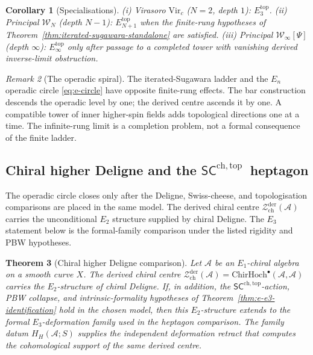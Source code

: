 \documentclass[11pt,reqno]{amsart}
\newtheorem{theorem}{Theorem}[section]
\newtheorem{corollary}[theorem]{Corollary}
\theoremstyle{definition}
\theoremstyle{remark}
\newtheorem{remark}[theorem]{Remark}
\providecommand{\cA}{\mathcal{A}}
\providecommand{\cW}{\mathcal{W}}
\providecommand{\cZ}{\mathcal{Z}}
\providecommand{\Eone}{E_1}
\providecommand{\Etwo}{E_2}
\providecommand{\Ethree}{E_3}
\providecommand{\En}{E_n}
\providecommand{\Einf}{E_\infty}
\providecommand{\SCchtop}{\ensuremath{\mathsf{SC}^{\mathrm{ch,top}}}}
\begin{document}
\begin{corollary}[Specialisations]
\label{cor:iterated-sugawara-specialisations-sa}
\textup{(i)} Virasoro $\mathrm{Vir}_c$ \textup{(}$N=2$,
depth $1$\textup{)}: $\Ethree^{\mathrm{top}}$.
\textup{(ii)} Principal $\cW_N$ \textup{(}depth $N-1$\textup{)}:
$E_{N+1}^{\mathrm{top}}$ when the finite-rung hypotheses of
Theorem~\ref{thm:iterated-sugawara-standalone} are satisfied.
\textup{(iii)} Principal $\cW_\infty[\Psi]$ \textup{(}depth
$\infty$\textup{)}: $\Einf^{\mathrm{top}}$ only after passage to a
completed tower with vanishing derived inverse-limit obstruction.
\end{corollary}

\begin{remark}[The operadic spiral]
\label{rem:operadic-spiral-sa}
The iterated-Sugawara ladder and the $\En$ operadic circle
\eqref{eq:e-circle} have opposite finite-rung effects. The bar
construction descends the operadic level by one; the derived centre
ascends it by one. A compatible tower of inner higher-spin fields adds
topological directions one at a time. The infinite-rung limit is a
completion problem, not a formal consequence of the finite ladder.
\end{remark}

\subsection[Chiral higher Deligne and the SC ch,top heptagon]{Chiral higher Deligne and the \SCchtop\ heptagon}
\label{subsec:chiral-higher-deligne}

The operadic circle closes only after the Deligne, Swiss-cheese, and
topologisation comparisons are placed in the same model. The derived
chiral centre \(\cZ^{\mathrm{der}}_{\mathrm{ch}}(\cA)\) carries the
unconditional \(\Etwo\) structure supplied by chiral Deligne. The
\(\Ethree\) statement below is the formal-family comparison under the
listed rigidity and PBW hypotheses.

\begin{theorem}[Chiral higher Deligne comparison]
\label{thm:chiral-higher-Deligne-sa}
Let $\cA$ be an $\Eone$-chiral algebra on a smooth curve $X$.
The derived chiral centre
\(\cZ^{\mathrm{der}}_{\mathrm{ch}}(\cA)
= \mathrm{ChirHoch}^\bullet(\cA,\cA)\) carries the \(\Etwo\)-structure
of chiral Deligne. If, in addition, the \(\SCchtop\)-action, PBW
collapse, and intrinsic-formality hypotheses of
Theorem~\ref{thm:e-e3-identification} hold in the chosen model, then
this \(\Etwo\)-structure extends to the formal \(\Ethree\)-deformation
family used in the heptagon comparison.  The family datum
$H_H(\cA;S)$ supplies the independent deformation retract that
computes the cohomological support of the same derived centre.
\end{theorem}
\end{document}
